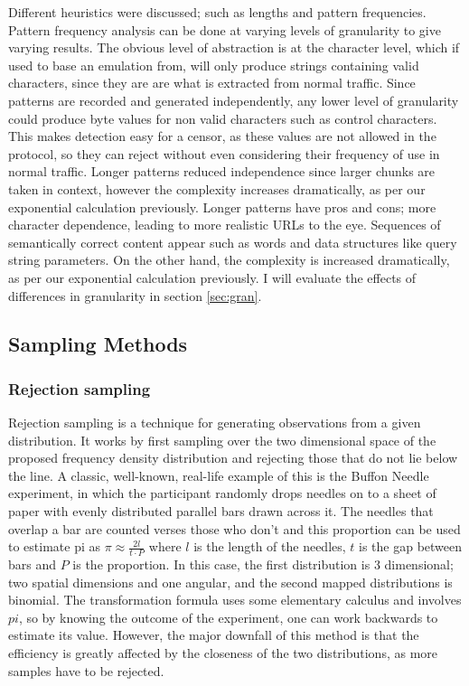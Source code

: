 \documentclass[ %
                    author={Samuel Russell},
                supervisor={Prof. Bogdan Warinschi},
                    degree={MEng},
                     title={Innocuous Ciphertexts},
                  subtitle={The DE-CENSOR Scheme},
                      type={research},
                      year={2018} ]{dissertation}
\begin{document}
Different heuristics were discussed; such as lengths and pattern frequencies.
Pattern frequency analysis can be done at varying levels of granularity to give varying results.
The obvious level of abstraction is at the character level, which if used to base an emulation from, will only produce strings containing valid characters, since they are are what is extracted from normal traffic.
Since patterns are recorded and generated independently, any lower level of granularity could produce byte values for non valid characters such as control characters.
This makes detection easy for a censor, as these values are not allowed in the protocol, so they can reject without even considering their frequency of use in normal traffic.
Longer patterns reduced independence since larger chunks are taken in context, however the complexity increases dramatically, as per our exponential calculation previously.
Longer patterns have pros and cons; more character dependence, leading to more realistic URLs to the eye. Sequences of semantically correct content appear such as words and data structures like query string parameters. On the other hand, the complexity is increased dramatically, as per our exponential calculation previously.
I will evaluate the effects of differences in granularity in section \ref{sec:gran}.


\subsection{Sampling Methods}

\subsubsection{Rejection sampling}

Rejection sampling is a technique for generating observations from a given distribution. 
It works by first sampling over the two dimensional space of the proposed frequency density distribution and rejecting those that do not lie below the line.
A classic, well-known, real-life example of this is the Buffon Needle experiment, in which the participant randomly drops needles on to a sheet of paper with evenly distributed parallel bars drawn across it.
The needles that overlap a bar are counted verses those who don't and this proportion can be used to estimate pi as $\pi \approx \frac{2l}{t \cdot P}$ where $l$ is the length of the needles, $t$ is the gap between bars and $P$ is the proportion.
In this case, the first distribution is 3 dimensional; two spatial dimensions and one angular, and the second mapped distributions is binomial.
The transformation formula uses some elementary calculus and involves $pi$, so by knowing the outcome of the experiment, one can work backwards to estimate its value.
However, the major downfall of this method is that the efficiency is greatly affected by the closeness of the two distributions, as more samples have to be rejected.
\end{document}
